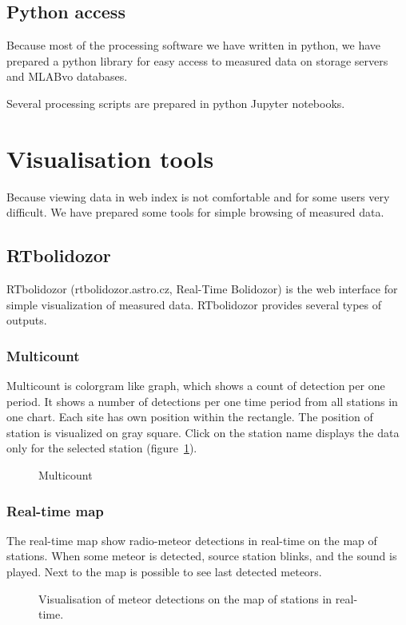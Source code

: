 \documentclass[10pt,a4paper,twoside,dvips]{article}
\begin{document}
\begin{IMCpaper}
\subsection{Python access}
Because most of the processing software we have written in python, we have prepared a python library for easy access to measured data on storage servers and MLABvo databases.                                       

Several processing scripts are prepared in python Jupyter notebooks.             

\section{Visualisation tools}
Because viewing data in web index is not comfortable and for some users very difficult. We have prepared some tools for simple browsing of measured data. 

\subsection{RTbolidozor}
RTbolidozor (rtbolidozor.astro.cz, Real-Time Bolidozor) is the web interface for simple visualization of measured data. RTbolidozor provides several types of outputs.
                                                
\subsubsection{Multicount}
Multicount is colorgram like graph, which shows a count of detection per one period. It shows a number of detections per one time period from all stations in one chart. Each site has own position within the rectangle. The position of station is visualized on gray square. Click on the station name displays the data only for the selected station (figure~\ref{RTBm}).

\begin{figure}[htb]
\centering
{}
\caption{Multicount}%
\label{RTBm}
\end{figure}

\subsubsection{Real-time map}
The real-time map show radio-meteor detections in real-time on the map of stations. When some meteor is detected, source station blinks, and the sound is played. Next to the map is possible to see last detected meteors.
\begin{figure}[!htb]
\centering
{}
\caption{Visualisation of meteor detections on the map of stations in real-time.}%
\label{RTBmmap}
\end{figure}


\end{IMCpaper}
\end{document}
